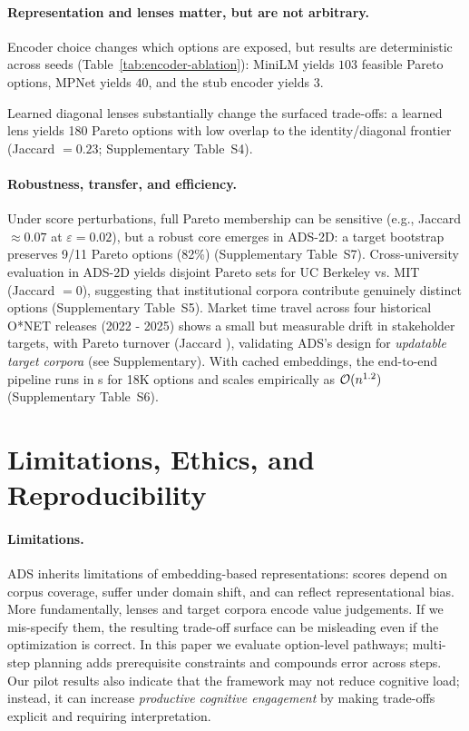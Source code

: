 \documentclass{article}
\newcommand{\ADS}{\textsc{ADS}\xspace}
\begin{document}


\paragraph{Representation and lenses matter, but are not arbitrary.}
Encoder choice changes which options are exposed, but results are deterministic across seeds (Table~\ref{tab:encoder-ablation}): MiniLM yields $103$ feasible Pareto options, MPNet yields $40$, and the stub encoder yields $3$.



Learned diagonal lenses substantially change the surfaced trade-offs: a learned lens yields {180} Pareto options with low overlap to the identity/diagonal frontier (Jaccard $=0.23$; Supplementary Table~S4).

\paragraph{Robustness, transfer, and efficiency.}
Under score perturbations, full Pareto membership can be sensitive (e.g., Jaccard $\approx 0.07$ at $\varepsilon{=}0.02$), but a robust core emerges in ADS-2D: a target bootstrap preserves {9/11} Pareto options (82\%) (Supplementary Table~S7). Cross-university evaluation in ADS-2D yields disjoint Pareto sets for UC Berkeley vs. MIT (Jaccard $=0$), suggesting that institutional corpora contribute genuinely distinct options (Supplementary Table~S5). {Market time travel} across four historical O*NET releases (2022 - 2025) shows a small but measurable drift in stakeholder targets, with {\MarketDriftTurnover} Pareto turnover (Jaccard \MarketDriftJaccard), validating \ADS's design for \emph{updatable target corpora} (see Supplementary). With cached embeddings, the end-to-end pipeline runs in {\MainRuntimeSec s} for 18K options and scales empirically as $\mathcal{O}(n^{1.2})$ (Supplementary Table~S6).



\section{Limitations, Ethics, and Reproducibility}
\label{sec:ethics}
\paragraph{Limitations.}
\ADS inherits limitations of embedding-based representations: scores depend on corpus coverage, suffer under domain shift, and can reflect representational bias. More fundamentally, lenses and target corpora encode value judgements. If we mis-specify them, the resulting trade-off surface can be misleading even if the optimization is correct. In this paper we evaluate option-level pathways; multi-step planning adds prerequisite constraints and compounds error across steps. Our pilot results also indicate that the framework may not reduce cognitive load; instead, it can increase \emph{productive cognitive engagement} by making trade-offs explicit and requiring interpretation.
\end{document}
